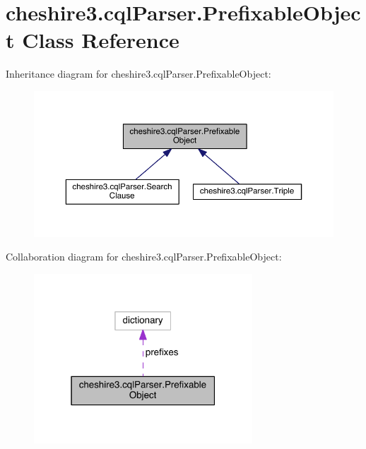\hypertarget{classcheshire3_1_1cql_parser_1_1_prefixable_object}{\section{cheshire3.\-cql\-Parser.\-Prefixable\-Object Class Reference}
\label{classcheshire3_1_1cql_parser_1_1_prefixable_object}
}


Inheritance diagram for cheshire3.\-cql\-Parser.\-Prefixable\-Object\-:
\nopagebreak
\begin{figure}[H]
\begin{center}
\leavevmode
\includegraphics[width=350pt]{classcheshire3_1_1cql_parser_1_1_prefixable_object__inherit__graph}
\end{center}
\end{figure}


Collaboration diagram for cheshire3.\-cql\-Parser.\-Prefixable\-Object\-:
\nopagebreak
\begin{figure}[H]
\begin{center}
\leavevmode
\includegraphics[width=232pt]{classcheshire3_1_1cql_parser_1_1_prefixable_object__coll__graph}
\end{center}
\end{figure}
